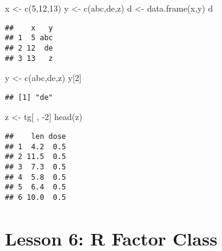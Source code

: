 \documentclass[
]{article}
\newenvironment{Shaded}{\begin{snugshade}}{\end{snugshade}}
\newcommand{\DecValTok}[1]{\textcolor[rgb]{0.00,0.00,0.81}{#1}}
\newcommand{\FunctionTok}[1]{\textcolor[rgb]{0.00,0.00,0.00}{#1}}
\newcommand{\NormalTok}[1]{#1}
\newcommand{\OtherTok}[1]{\textcolor[rgb]{0.56,0.35,0.01}{#1}}
\newcommand{\SpecialCharTok}[1]{\textcolor[rgb]{0.00,0.00,0.00}{#1}}
\newcommand{\StringTok}[1]{\textcolor[rgb]{0.31,0.60,0.02}{#1}}
\begin{document}
\begin{Shaded}
\begin{Highlighting}[]
\NormalTok{x }\OtherTok{\textless{}{-}} \FunctionTok{c}\NormalTok{(}\DecValTok{5}\NormalTok{,}\DecValTok{12}\NormalTok{,}\DecValTok{13}\NormalTok{)}
\NormalTok{y }\OtherTok{\textless{}{-}} \FunctionTok{c}\NormalTok{(}\StringTok{\textquotesingle{}abc\textquotesingle{}}\NormalTok{,}\StringTok{\textquotesingle{}de\textquotesingle{}}\NormalTok{,}\StringTok{\textquotesingle{}z\textquotesingle{}}\NormalTok{)}
\NormalTok{d }\OtherTok{\textless{}{-}} \FunctionTok{data.frame}\NormalTok{(x,y)}
\NormalTok{d}
\end{Highlighting}
\end{Shaded}

\begin{verbatim}
##    x   y
## 1  5 abc
## 2 12  de
## 3 13   z
\end{verbatim}

\begin{Shaded}
\begin{Highlighting}[]
\NormalTok{y }\OtherTok{\textless{}{-}} \FunctionTok{c}\NormalTok{(}\StringTok{\textquotesingle{}abc\textquotesingle{}}\NormalTok{,}\StringTok{\textquotesingle{}de\textquotesingle{}}\NormalTok{,}\StringTok{\textquotesingle{}z\textquotesingle{}}\NormalTok{)}
\NormalTok{y[}\DecValTok{2}\NormalTok{]}
\end{Highlighting}
\end{Shaded}

\begin{verbatim}
## [1] "de"
\end{verbatim}

\begin{Shaded}
\begin{Highlighting}[]
\NormalTok{z }\OtherTok{\textless{}{-}}\NormalTok{ tg[ , }\SpecialCharTok{{-}}\DecValTok{2}\NormalTok{]}
\FunctionTok{head}\NormalTok{(z)}
\end{Highlighting}
\end{Shaded}

\begin{verbatim}
##    len dose
## 1  4.2  0.5
## 2 11.5  0.5
## 3  7.3  0.5
## 4  5.8  0.5
## 5  6.4  0.5
## 6 10.0  0.5
\end{verbatim}

\hypertarget{lesson-6-r-factor-class}{%
\section{Lesson 6: R Factor Class}\label{lesson-6-r-factor-class}}
\end{document}
